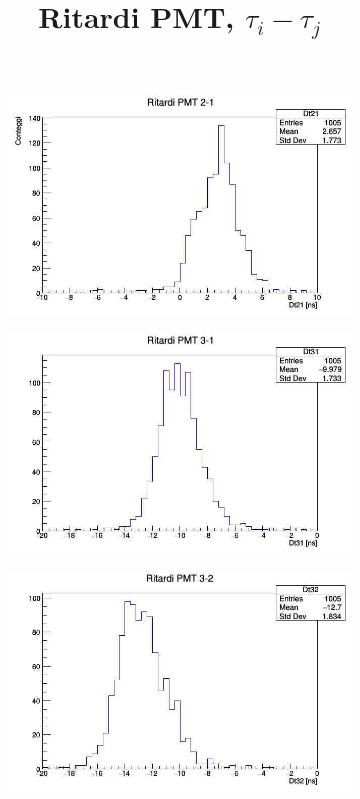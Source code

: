 \documentclass[a4paper,twocolumn]{article}
\begin{document}
\begin{figure}[H]
\centering
\title{Ritardi PMT, $\tau_i - \tau _j$}
\begin{center}
\begin{subfigure}[b]{0.45\textwidth}
\includegraphics[width=\textwidth]{./immagini/TimeOfFlight/Rit21Fore.jpg}
\caption{}
\label{fig:Dt21Fore}
\end{subfigure}
\hfill
\begin{subfigure}[b]{0.45\textwidth}
\includegraphics[width=\textwidth]{./immagini/TimeOfFlight/Rit31Fore.jpg}
\caption{}
\label{fig:Dt31Fore}
\end{subfigure}
\hfill
\begin{subfigure}[b]{0.45\textwidth}
\includegraphics[width=\textwidth]{./immagini/TimeOfFlight/Rit32Fore.jpg}

\end{subfigure}
\end{center}
\end{figure}
\end{document}
